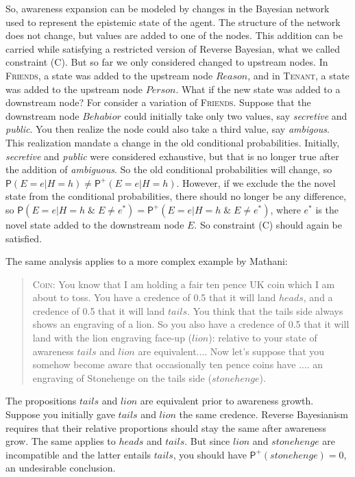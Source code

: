 \documentclass[
  11pt,
  dvipsnames,enabledeprecatedfontcommands]{scrartcl}
\newcommand{\pr}[1]{\ensuremath{\mathsf{P}(#1)}}
\newcommand{\ppr}[2]{\ensuremath{\mathsf{P}^{#1}(#2)}}
\begin{document}
So, awareness expansion can be modeled by changes in the Bayesian
network used to represent the epistemic state of the agent. The
structure of the network does not change, but values are added to one of
the nodes. This addition can be carried while satisfying a restricted
version of Reverse Bayesian, what we called constraint (C). But so far
we only considered changed to upstream nodes. In \textsc{Friends}, a
state was added to the upstream node \(Reason\), and in \textsc{Tenant},
a state was added to the upstream node \(Person\). What if the new state
was added to a downstream node? For consider a variation of
\textsc{Friends}. Suppose that the downstream node \(Behabior\) could
initially take only two values, say \textit{secretive} and
\textit{public}. You then realize the node could also take a third
value, say \textit{ambigous}. This realization mandate a change in the
old conditional probabilities. Initially, \textit{secretive} and
\textit{public} were considered exhaustive, but that is no longer true
after the addition of \textit{ambiguous}. So the old conditional
probabilities will change, so
\(\pr{E=e \vert H=h}\neq \ppr{+}{E=e \vert H=h}\). However, if we
exclude the the novel state from the conditional probabilities, there
should no longer be any difference, so
\(\pr{E=e \vert H=h \; \& \; E\neq e^* } = \ppr{+}{E=e \vert H=h \; \& \; E\neq e^*}\),
where \(e^*\) is the novel state added to the downstream node \(E\). So
constraint (C) should again be satisfied.

The same analysis applies to a more complex example by Mathani:

\begin{quote} 
\textsc{Coin}: You know that I am holding a fair ten pence UK coin which I am about to toss. You
have a credence of 0.5 that it will land $heads$, and a credence of 0.5 that it will
land $tails$. You think that the tails side always shows an engraving of a lion. So you
also  have a credence of 0.5 that it will land with the lion engraving face-up ($lion$): relative to your state of awareness $tails$ and $lion$ are equivalent.... Now let's suppose that you somehow become aware that occasionally ten pence coins have .... an engraving of Stonehenge on the tails side ($stonehenge$). 
\end{quote}

\doublespace

\noindent  The propositions \(tails\) and \(lion\) are equivalent prior
to awareness growth. Suppose you initially gave \(tails\) and \(lion\)
the same credence. Reverse Bayesianism requires that their relative
proportions should stay the same after awareness grow. The same applies
to \(heads\) and \(tails\). But since \(lion\) and \(stonehenge\) are
incompatible and the latter entails \(tails\), you should have
\(\ppr{+}{stonehenge} = 0\), an undesirable conclusion.
\end{document}
